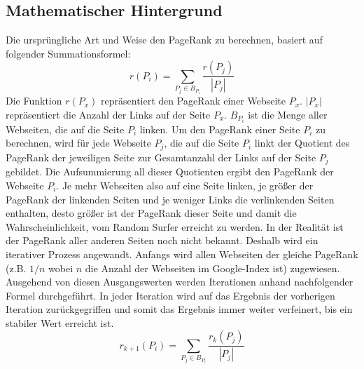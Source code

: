 \documentclass[12pt, a4paper]{llncs}
\begin{document}
	\subsection{Mathematischer Hintergrund}
	Die ursprüngliche Art und Weise den PageRank zu berechnen, basiert auf folgender Summationsformel:
	\begin{displaymath}
		r(P_i)=\sum_{P_j\in B_{P_i}} \frac{r(P_j)}{|P_j|}
	\end{displaymath}
	Die Funktion $r(P_x)$ repräsentiert den PageRank einer Webseite $P_x$.\newline
	$|P_x|$ repräsentiert die Anzahl der Links auf der Seite $P_x$.\newline
	$B_{P_i}$ ist die Menge aller Webseiten, die auf die Seite $P_i$ linken.\newline
	Um den PageRank einer Seite $P_i$ zu berechnen, wird für jede Webseite $P_j$, die auf die Seite $P_i$ linkt der Quotient des PageRank der jeweiligen Seite zur
	Gesamtanzahl der Links auf der Seite $P_j$ gebildet. Die Aufsummierung all dieser Quotienten ergibt den PageRank der Webseite $P_i$. Je mehr Webseiten also auf
	eine Seite linken, je größer der PageRank der linkenden Seiten und je weniger Links die verlinkenden Seiten enthalten, desto größer ist der PageRank dieser
	Seite und damit die Wahrscheinlichkeit, vom Random Surfer erreicht zu werden.\newline
	In der Realität ist der PageRank aller anderen Seiten noch nicht bekannt. Deshalb wird ein iterativer Prozess angewandt. Anfangs wird allen Webseiten der gleiche
	PageRank (z.B. $1/n$ wobei $n$ die Anzahl der Webseiten im Google-Index ist) zugewiesen. Ausgehend von diesen Ausgangswerten werden Iterationen anhand nachfolgender
	Formel durchgeführt. In jeder Iteration wird auf das Ergebnis der vorherigen Iteration zurückgegriffen und somit das Ergebnis immer weiter verfeinert, bis ein stabiler
	Wert erreicht ist\cite{langville11}.
	\begin{displaymath}
	r_{k+1}(P_i)=\sum_{P_j\in B_{P_i}} \frac{r_k(P_j)}{|P_j|}
	\end{displaymath}
	
	
\end{document}
